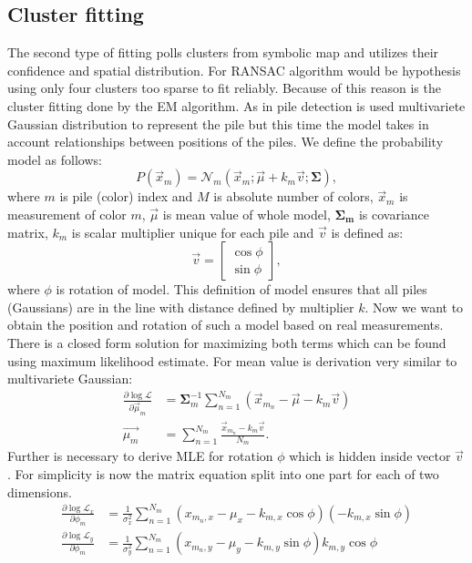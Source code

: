 \subsection{Cluster fitting}
The second type of fitting polls clusters from symbolic map and utilizes their confidence and spatial distribution. For RANSAC algorithm would be hypothesis using only four clusters too sparse to fit reliably. Because of this reason is the cluster fitting done by the EM algorithm. As in pile detection is used multivariete Gaussian distribution to represent the pile but this time the model takes in account relationships between positions of the piles. We define the probability model as follows:
\begin{equation}
P(\vec{x}_m) = \mathcal{N}_m(\vec{x}_m; \vec{\mu} + k_m\vec{v}; \bm{\Sigma}),
\label{eq:prob}
\end{equation}
where $m$ is pile (color) index and $M$ is absolute number of colors, $\vec{x}_m$ is measurement of color $m$, $\vec{\mu}$ is mean value of whole model, $\bm{\Sigma_m}$ is covariance matrix, $k_m$ is scalar multiplier unique for each pile and $\vec{v}$ is defined as:
\begin{equation}
\vec{v} = \begin{bmatrix}
\cos \phi \\
\sin \phi
\end{bmatrix},
\end{equation}
where $\phi$ is rotation of model. This definition of model ensures that all piles (Gaussians) are in the line with distance defined by multiplier $k$. Now we want to obtain the position and rotation of such a model based on real measurements. There is a closed form solution for maximizing both terms which can be found using maximum likelihood estimate. For mean value is derivation very similar to multivariete Gaussian:
\begin{align}
\frac{\partial \log\mathcal{L} }{\partial \vec{\mu}_m} &=  \bm{\Sigma}^{-1}_m \sum_{n = 1}^{N_m} (\vec{x}_{m_n} - \vec{\mu} - k_m \vec{v}) \\
\vec{\mu_m} &= \sum_{n = 1}^{N_m} \frac{\vec{x}_{m_n} - k_m \vec{v}}{N_m}.
\end{align}
Further is necessary to derive MLE for rotation $\phi$ which is hidden inside vector $\vec{v}$. For simplicity is now the matrix equation split into one part for each of two dimensions.  
\begin{align}
\frac{\partial \log\mathcal{L}_x }{\partial \phi_m} &= \frac{1}{\sigma^2_x} \sum_{n=1}^{N_m} (x_{m_n, x} - \mu_x - k_{m, x} \cos \phi) \left( -k_{m,x} \sin \phi\right)  \\
\frac{\partial \log\mathcal{L}_y }{\partial \phi_m} &= \frac{1}{\sigma^2_y} \sum_{n=1}^{N_m} (x_{m_n, y} - \mu_y - k_{m, y} \sin \phi) k_{m,y} \cos \phi
\end{align}
